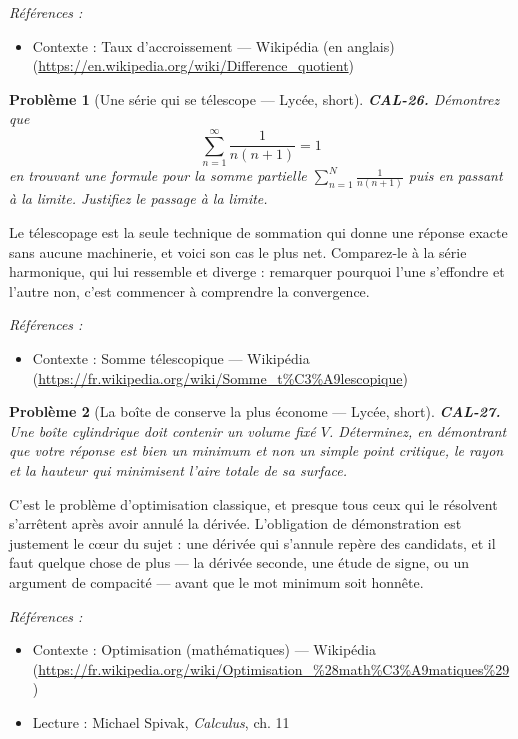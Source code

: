 \documentclass[11pt]{article}
\newtheorem{problem}{Problème}
\newenvironment{refs}{\par\small\noindent\emph{Références :}\begin{itemize}\setlength\itemsep{0pt}}{\end{itemize}\normalsize}
\begin{document}
\begin{refs}
\item Contexte : Taux d'accroissement --- Wikipédia (en anglais) (\url{https://en.wikipedia.org/wiki/Difference_quotient})
\end{refs}

\bigskip

\begin{problem}[{Une série qui se télescope --- Lycée, short}]
\textbf{CAL-26.} Démontrez que
\[ \sum_{n=1}^{\infty} \frac{1}{n(n+1)} = 1 \]
en trouvant une formule pour la somme partielle $ \sum_{n=1}^{N} \frac{1}{n(n+1)} $ puis en passant à la limite. Justifiez le passage à la limite.
\end{problem}

\noindent Le télescopage est la seule technique de sommation qui donne une réponse exacte sans aucune machinerie, et voici son cas le plus net. Comparez-le à la série harmonique, qui lui ressemble et diverge : remarquer pourquoi l'une s'effondre et l'autre non, c'est commencer à comprendre la convergence.

\begin{refs}
\item Contexte : Somme télescopique --- Wikipédia (\url{https://fr.wikipedia.org/wiki/Somme_t%C3%A9lescopique})
\end{refs}

\bigskip

\begin{problem}[{La boîte de conserve la plus économe --- Lycée, short}]
\textbf{CAL-27.} Une boîte cylindrique doit contenir un volume fixé $ V $. Déterminez, en démontrant que votre réponse est bien un minimum et non un simple point critique, le rayon et la hauteur qui minimisent l'aire totale de sa surface.
\end{problem}

\noindent C'est le problème d'optimisation classique, et presque tous ceux qui le résolvent s'arrêtent après avoir annulé la dérivée. L'obligation de démonstration est justement le c\oe{}ur du sujet : une dérivée qui s'annule repère des candidats, et il faut quelque chose de plus --- la dérivée seconde, une étude de signe, ou un argument de compacité --- avant que le mot \og{} minimum \fg{} soit honnête.

\begin{refs}
\item Contexte : Optimisation (mathématiques) --- Wikipédia (\url{https://fr.wikipedia.org/wiki/Optimisation_%28math%C3%A9matiques%29})
\item Lecture : Michael Spivak, \textit{Calculus}, ch. 11
\end{refs}
\end{document}

